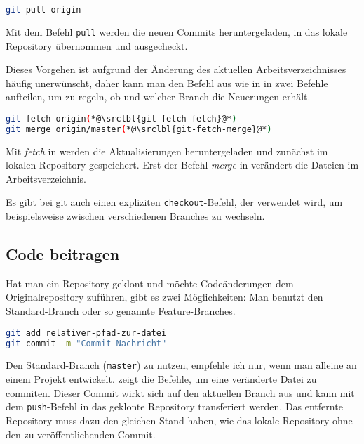 \begin{lstlisting}[language=sh,caption={Mit git \emph{pull} auf Originalrepository ausführen},label=\lstlbl{git-pull}]
git pull origin
\end{lstlisting}

Mit dem Befehl \texttt{pull} werden die neuen Commits heruntergeladen, in das lokale Repository übernommen und ausgecheckt.

Dieses Vorgehen ist aufgrund der Änderung des aktuellen Arbeitsverzeichnisses häufig unerwünscht, daher kann man den Befehl aus  wie in  in zwei Befehle aufteilen, um zu regeln, ob und welcher Branch die Neuerungen erhält.

\begin{lstlisting}[language=sh,caption={\emph{pull} in zwei Befehlen manuell ausführen},label=\lstlbl{git-fetch-merge}]
git fetch origin(*@\srclbl{git-fetch-fetch}@*)
git merge origin/master(*@\srclbl{git-fetch-merge}@*)
\end{lstlisting}

Mit \emph{fetch} in  werden die Aktualisierungen heruntergeladen und zunächst im lokalen Repository gespeichert. Erst der Befehl \emph{merge} in  verändert die Dateien im Arbeitsverzeichnis.

Es gibt bei \gls{git} auch einen expliziten \texttt{checkout}-Befehl, der verwendet wird, um beispielsweise zwischen verschiedenen Branches zu wechseln.

\subsection{Code beitragen}
Hat man ein Repository geklont und möchte Codeänderungen dem Originalrepository zuführen, gibt es zwei Möglichkeiten: Man benutzt den Standard-Branch oder so genannte Feature-Branches.

\begin{lstlisting}[language=sh,caption={Eine Datei mit git committen},label=\lstlbl{git-commit}]
git add relativer-pfad-zur-datei
git commit -m "Commit-Nachricht"
\end{lstlisting}

Den Standard-Branch (\texttt{master}) zu nutzen, empfehle ich nur, wenn man alleine an einem Projekt entwickelt.  zeigt die Befehle, um eine veränderte Datei zu commiten. Dieser Commit wirkt sich auf den aktuellen Branch aus und kann mit dem \texttt{push}-Befehl in das geklonte Repository transferiert werden. Das entfernte Repository muss dazu den gleichen Stand haben, wie das lokale Repository ohne den zu veröffentlichenden Commit.

